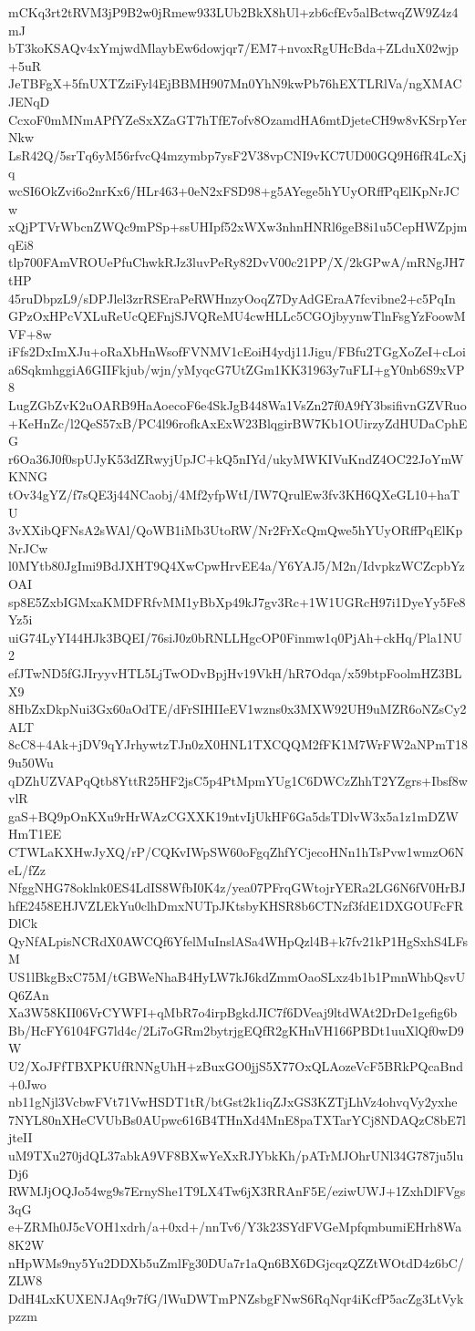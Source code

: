 mCKq3rt2tRVM3jP9B2w0jRmew933LUb2BkX8hUl+zb6cfEv5alBctwqZW9Z4z4mJ
bT3koKSAQv4xYmjwdMlaybEw6dowjqr7/EM7+nvoxRgUHcBda+ZLduX02wjp+5uR
JeTBFgX+5fnUXTZziFyl4EjBBMH907Mn0YhN9kwPb76hEXTLRlVa/ngXMACJENqD
CcxoF0mMNmAPfYZeSxXZaGT7hTfE7ofv8OzamdHA6mtDjeteCH9w8vKSrpYerNkw
LsR42Q/5srTq6yM56rfvcQ4mzymbp7ysF2V38vpCNI9vKC7UD00GQ9H6fR4LcXjq
wcSI6OkZvi6o2nrKx6/HLr463+0eN2xFSD98+g5AYege5hYUyORffPqElKpNrJCw
xQjPTVrWbcnZWQc9mPSp+ssUHIpf52xWXw3nhnHNRl6geB8i1u5CepHWZpjmqEi8
tlp700FAmVROUePfuChwkRJz3luvPeRy82DvV00c21PP/X/2kGPwA/mRNgJH7tHP
45ruDbpzL9/sDPJlel3zrRSEraPeRWHnzyOoqZ7DyAdGEraA7fcvibne2+c5PqIn
GPzOxHPcVXLuReUcQEFnjSJVQReMU4cwHLLc5CGOjbyynwTlnFsgYzFoowMVF+8w
iFfs2DxImXJu+oRaXbHnWsofFVNMV1cEoiH4ydj11Jigu/FBfu2TGgXoZeI+cLoi
a6SqkmhggiA6GIIFkjub/wjn/yMyqcG7UtZGm1KK31963y7uFLI+gY0nb6S9xVP8
LugZGbZvK2uOARB9HaAoecoF6e4SkJgB448Wa1VsZn27f0A9fY3bsifivnGZVRuo
+KeHnZc/l2QeS57xB/PC4l96rofkAxExW23BlqgirBW7Kb1OUirzyZdHUDaCphEG
r6Oa36J0f0spUJyK53dZRwyjUpJC+kQ5nIYd/ukyMWKIVuKndZ4OC22JoYmWKNNG
tOv34gYZ/f7sQE3j44NCaobj/4Mf2yfpWtI/IW7QrulEw3fv3KH6QXeGL10+haTU
3vXXibQFNsA2sWAl/QoWB1iMb3UtoRW/Nr2FrXcQmQwe5hYUyORffPqElKpNrJCw
l0MYtb80JgImi9BdJXHT9Q4XwCpwHrvEE4a/Y6YAJ5/M2n/IdvpkzWCZcpbYzOAI
sp8E5ZxbIGMxaKMDFRfvMM1yBbXp49kJ7gv3Rc+1W1UGRcH97i1DyeYy5Fe8Yz5i
uiG74LyYI44HJk3BQEI/76siJ0z0bRNLLHgcOP0Finmw1q0PjAh+ckHq/Pla1NU2
efJTwND5fGJIryyvHTL5LjTwODvBpjHv19VkH/hR7Odqa/x59btpFoolmHZ3BLX9
8HbZxDkpNui3Gx60aOdTE/dFrSIHIIeEV1wzns0x3MXW92UH9uMZR6oNZsCy2ALT
8cC8+4Ak+jDV9qYJrhywtzTJn0zX0HNL1TXCQQM2fFK1M7WrFW2aNPmT189u50Wu
qDZhUZVAPqQtb8YttR25HF2jsC5p4PtMpmYUg1C6DWCzZhhT2YZgrs+Ibsf8wvlR
gaS+BQ9pOnKXu9rHrWAzCGXXK19ntvIjUkHF6Ga5dsTDlvW3x5a1z1mDZWHmT1EE
CTWLaKXHwJyXQ/rP/CQKvIWpSW60oFgqZhfYCjecoHNn1hTsPvw1wmzO6NeL/fZz
NfggNHG78oklnk0ES4LdIS8WfbI0K4z/yea07PFrqGWtojrYERa2LG6N6fV0HrBJ
hfE2458EHJVZLEkYu0clhDmxNUTpJKtsbyKHSR8b6CTNzf3fdE1DXGOUFcFRDlCk
QyNfALpisNCRdX0AWCQf6YfelMuInslASa4WHpQzl4B+k7fv21kP1HgSxhS4LFsM
US1lBkgBxC75M/tGBWeNhaB4HyLW7kJ6kdZmmOaoSLxz4b1b1PmnWhbQsvUQ6ZAn
Xa3W58KII06VrCYWFI+qMbR7o4irpBgkdJIC7f6DVeaj9ltdWAt2DrDe1gefig6b
Bb/HcFY6104FG7ld4c/2Li7oGRm2bytrjgEQfR2gKHnVH166PBDt1uuXlQf0wD9W
U2/XoJFfTBXPKUfRNNgUhH+zBuxGO0jjS5X77OxQLAozeVcF5BRkPQcaBnd+0Jwo
nb11gNjl3VcbwFVt71VwHSDT1tR/btGst2k1iqZJxGS3KZTjLhVz4ohvqVy2yxhe
7NYL80nXHeCVUbBs0AUpwc616B4THnXd4MnE8paTXTarYCj8NDAQzC8bE7ljteII
uM9TXu270jdQL37abkA9VF8BXwYeXxRJYbkKh/pATrMJOhrUNl34G787ju5luDj6
RWMJjOQJo54wg9s7ErnyShe1T9LX4Tw6jX3RRAnF5E/eziwUWJ+1ZxhDlFVgs3qG
e+ZRMh0J5cVOH1xdrh/a+0xd+/nnTv6/Y3k23SYdFVGeMpfqmbumiEHrh8Wa8K2W
nHpWMs9ny5Yu2DDXb5uZmlFg30DUa7r1aQn6BX6DGjcqzQZZtWOtdD4z6bC/ZLW8
DdH4LxKUXENJAq9r7fG/lWuDWTmPNZsbgFNwS6RqNqr4iKcfP5acZg3LtVykpzzm
